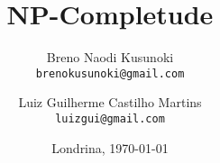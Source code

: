 \title{NP-Completude}

\author{Breno Naodi Kusunoki \\
        \texttt{brenokusunoki@gmail.com}
        \and 
        Luiz Guilherme Castilho Martins \\
        \texttt{luizgui@gmail.com}
} 

\date{Londrina, \today}

